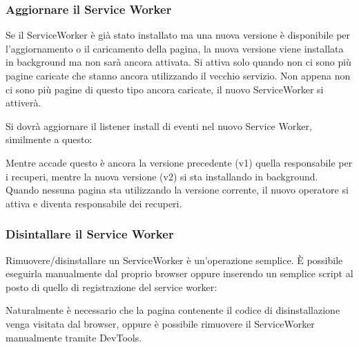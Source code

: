 \documentclass[11pt ,a4paper , twoside , openright ]{article}
\begin{document}
\subsubsection{Aggiornare il Service Worker}
Se il ServiceWorker è già stato installato ma una nuova versione è disponibile per l'aggiornamento o il caricamento della pagina, la nuova versione viene installata in background ma non sarà ancora attivata. Si attiva solo quando non ci sono più pagine caricate che stanno ancora utilizzando il vecchio servizio. Non appena non ci sono più pagine di questo tipo ancora caricate, il nuovo ServiceWorker si attiverà.

Si dovrà aggiornare il listener install di eventi nel nuovo Service Worker, similmente a questo:

Mentre accade questo è ancora la versione precedente (v1) quella responsabile per i recuperi, mentre la nuova versione (v2) si sta installando in background.
Quando nessuna pagina sta utilizzando la versione corrente, il nuovo operatore si attiva e diventa responsabile dei recuperi.

\subsubsection{Disintallare il Service Worker}

Rimuovere/disinstallare un ServiceWorker è un’operazione semplice. È possibile eseguirla manualmente dal proprio browser oppure inserendo un semplice script al posto di quello di registrazione del service worker:

Naturalmente è necessario che la pagina contenente il codice di disinstallazione venga visitata dal browser, oppure è possibile rimuovere il ServiceWorker manualmente tramite DevTools.
\newpage
\end{document}
